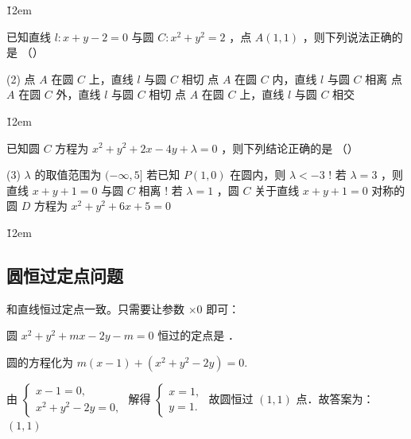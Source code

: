 \v{12em}

\begin{example}
    已知直线 $l: x+y-2=0$ 与圆 $C: x^2+y^2=2$ ，点 $A(1,1)$ ，则下列说法正确的是 （\qquad）
    \begin{tasks}(2)
        \task 点 $A$ 在圆 $C$ 上，直线 $l$ 与圆 $C$ 相切
        \task 点 $A$ 在圆 $C$ 内，直线 $l$ 与圆 $C$ 相离
        \task 点 $A$ 在圆 $C$ 外，直线 $l$ 与圆 $C$ 相切
        \task 点 $A$ 在圆 $C$ 上，直线 $l$ 与圆 $C$ 相交
    \end{tasks}
\end{example}

\v{12em}

\begin{example}
    已知圆 $C$ 方程为 $x^2+y^2+2 x-4 y+\lambda=0$ ，则下列结论正确的是 （\qquad）
    \begin{tasks}(3)
        \task $\lambda$ 的取值范围为 $(-\infty, 5]$
        \task 若已知 $P(1,0)$ 在圆内，则 $\lambda<-3$
        \task! 若 $\lambda=3$ ，则直线 $x+y+1=0$ 与圆 $C$ 相离
        \task! 若 $\lambda=1$ ，圆 $C$ 关于直线 $x+y+1=0$ 对称的圆 $D$ 方程为 $x^2+y^2+6 x+5=0$
    \end{tasks}
\end{example}

\v{12em}

\subsection{圆恒过定点问题}

\begin{theorem}
    和直线恒过定点一致。只需要让参数 $\times 0$ 即可：
\end{theorem}

\begin{example}
    圆 $x^2+y^2+m x-2 y-m=0$ 恒过的定点是 \underline{\qquad}．
\end{example}

\begin{solution}
    圆的方程化为 $m(x-1)+\left(x^2+y^2-2 y\right)=0$.

    由 $\left\{\begin{array}{l}x-1=0, \\ x^2+y^2-2 y=0,\end{array}\right.$ 解得 $\left\{\begin{array}{c}x=1, \\ y=1 .\end{array}\right.$ 故圆恒过 $(1,1)$ 点．故答案为：$(1,1)$
\end{solution}

